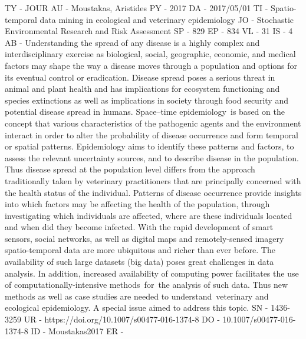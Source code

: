 TY  - JOUR
AU  - Moustakas, Aristides
PY  - 2017
DA  - 2017/05/01
TI  - Spatio-temporal data mining in ecological and veterinary epidemiology
JO  - Stochastic Environmental Research and Risk Assessment
SP  - 829
EP  - 834
VL  - 31
IS  - 4
AB  - Understanding the spread of any disease is a highly complex and interdisciplinary exercise as biological, social, geographic, economic, and medical factors may shape the way a disease moves through a population and options for its eventual control or eradication. Disease spread poses a serious threat in animal and plant health and has implications for ecosystem functioning and species extinctions as well as implications in society through food security and potential disease spread in humans. Space–time epidemiology is based on the concept that various characteristics of the pathogenic agents and the environment interact in order to alter the probability of disease occurrence and form temporal or spatial patterns. Epidemiology aims to identify these patterns and factors, to assess the relevant uncertainty sources, and to describe disease in the population. Thus disease spread at the population level differs from the approach traditionally taken by veterinary practitioners that are principally concerned with the health status of the individual. Patterns of disease occurrence provide insights into which factors may be affecting the health of the population, through investigating which individuals are affected, where are these individuals located and when did they become infected. With the rapid development of smart sensors, social networks, as well as digital maps and remotely-sensed imagery spatio-temporal data are more ubiquitous and richer than ever before. The availability of such large datasets (big data) poses great challenges in data analysis. In addition, increased availability of computing power facilitates the use of computationally-intensive methods for the analysis of such data. Thus new methods as well as case studies are needed to understand veterinary and ecological epidemiology. A special issue aimed to address this topic.
SN  - 1436-3259
UR  - https://doi.org/10.1007/s00477-016-1374-8
DO  - 10.1007/s00477-016-1374-8
ID  - Moustakas2017
ER  - 
